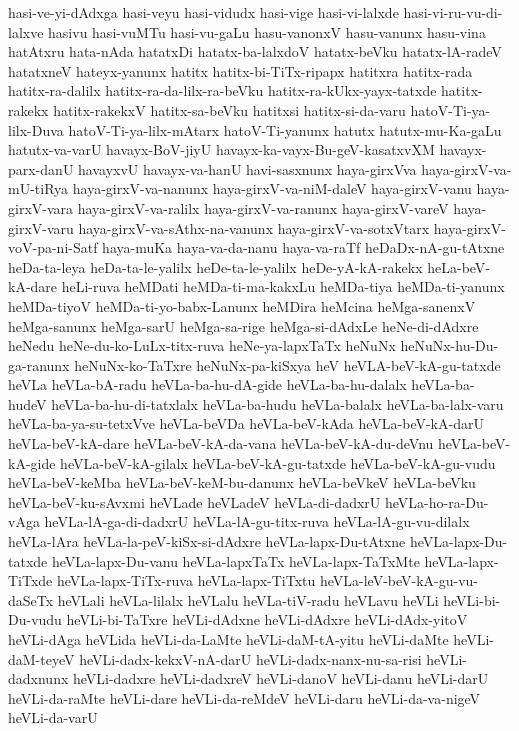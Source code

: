 {hasi-ve-yi-dAdxga
hasi-veyu
hasi-vidudx
hasi-vige
hasi-vi-lalxde
hasi-vi-ru-vu-di-lalxve
hasivu
hasi-vuMTu
hasi-vu-gaLu
hasu-vanonxV
hasu-vanunx
hasu-vina
hatAtxru
hata-nAda
hatatxDi
hatatx-ba-lalxdoV
hatatx-beVku
hatatx-lA-radeV
hatatxneV
hateyx-yanunx
hatitx
hatitx-bi-TiTx-ripapx
hatitxra
hatitx-rada
hatitx-ra-dalilx
hatitx-ra-da-lilx-ra-beVku
hatitx-ra-kUkx-yayx-tatxde
hatitx-rakekx
hatitx-rakekxV
hatitx-sa-beVku
hatitxsi
hatitx-si-da-varu
hatoV-Ti-ya-lilx-Duva
hatoV-Ti-ya-lilx-mAtarx
hatoV-Ti-yanunx
hatutx
hatutx-mu-Ka-gaLu
hatutx-va-varU
havayx-BoV-jiyU
havayx-ka-vayx-Bu-geV-kasatxvXM
havayx-parx-danU
havayxvU
havayx-va-hanU
havi-sasxnunx
haya-girxVva
haya-girxV-va-mU-tiRya
haya-girxV-va-nanunx
haya-girxV-va-niM-daleV
haya-girxV-vanu
haya-girxV-vara
haya-girxV-va-ralilx
haya-girxV-va-ranunx
haya-girxV-vareV
haya-girxV-varu
haya-girxV-va-sAthx-na-vanunx
haya-girxV-va-sotxVtarx
haya-girxV-voV-pa-ni-Satf
haya-muKa
haya-va-da-nanu
haya-va-raTf
heDaDx-nA-gu-tAtxne
heDa-ta-leya
heDa-ta-le-yalilx
heDe-ta-le-yalilx
heDe-yA-kA-rakekx
heLa-beV-kA-dare
heLi-ruva
heMDati
heMDa-ti-ma-kakxLu
heMDa-tiya
heMDa-ti-yanunx
heMDa-tiyoV
heMDa-ti-yo-babx-Lanunx
heMDira
heMcina
heMga-sanenxV
heMga-sanunx
heMga-sarU
heMga-sa-rige
heMga-si-dAdxLe
heNe-di-dAdxre
heNedu
heNe-du-ko-LuLx-titx-ruva
heNe-ya-lapxTaTx
heNuNx
heNuNx-hu-Du-ga-ranunx
heNuNx-ko-TaTxre
heNuNx-pa-kiSxya
heV
heVLA-beV-kA-gu-tatxde
heVLa
heVLa-bA-radu
heVLa-ba-hu-dA-gide
heVLa-ba-hu-dalalx
heVLa-ba-hudeV
heVLa-ba-hu-di-tatxlalx
heVLa-ba-hudu
heVLa-balalx
heVLa-ba-lalx-varu
heVLa-ba-ya-su-tetxVve
heVLa-beVDa
heVLa-beV-kAda
heVLa-beV-kA-darU
heVLa-beV-kA-dare
heVLa-beV-kA-da-vana
heVLa-beV-kA-du-deVnu
heVLa-beV-kA-gide
heVLa-beV-kA-gilalx
heVLa-beV-kA-gu-tatxde
heVLa-beV-kA-gu-vudu
heVLa-beV-keMba
heVLa-beV-keM-bu-danunx
heVLa-beVkeV
heVLa-beVku
heVLa-beV-ku-sAvxmi
heVLade
heVLadeV
heVLa-di-dadxrU
heVLa-ho-ra-Du-vAga
heVLa-lA-ga-di-dadxrU
heVLa-lA-gu-titx-ruva
heVLa-lA-gu-vu-dilalx
heVLa-lAra
heVLa-la-peV-kiSx-si-dAdxre
heVLa-lapx-Du-tAtxne
heVLa-lapx-Du-tatxde
heVLa-lapx-Du-vanu
heVLa-lapxTaTx
heVLa-lapx-TaTxMte
heVLa-lapx-TiTxde
heVLa-lapx-TiTx-ruva
heVLa-lapx-TiTxtu
heVLa-leV-beV-kA-gu-vu-daSeTx
heVLali
heVLa-lilalx
heVLalu
heVLa-tiV-radu
heVLavu
heVLi
heVLi-bi-Du-vudu
heVLi-bi-TaTxre
heVLi-dAdxne
heVLi-dAdxre
heVLi-dAdx-yitoV
heVLi-dAga
heVLida
heVLi-da-LaMte
heVLi-daM-tA-yitu
heVLi-daMte
heVLi-daM-teyeV
heVLi-dadx-kekxV-nA-darU
heVLi-dadx-nanx-nu-sa-risi
heVLi-dadxnunx
heVLi-dadxre
heVLi-dadxreV
heVLi-danoV
heVLi-danu
heVLi-darU
heVLi-da-raMte
heVLi-dare
heVLi-da-reMdeV
heVLi-daru
heVLi-da-va-nigeV
heVLi-da-varU
}
